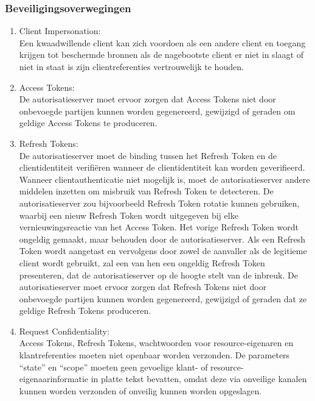 \subsubsection{Beveiligingsoverwegingen}
\label{subsubsec:beveiligingsoverwegingen}
\begin{enumerate}[label=\textbf{-}]
    \item Client Impersonation: \\
    Een kwaadwillende client kan zich voordoen als een andere client en toegang krijgen tot beschermde bronnen als de nagebootste client er niet in slaagt of niet in staat is zijn clientreferenties vertrouwelijk te houden.

    \item Access Tokens: \\
    De autorisatieserver moet ervoor zorgen dat Access Tokens niet door onbevoegde partijen kunnen worden gegenereerd, gewijzigd of geraden om geldige Access Tokens te produceren.

    \item Refresh Tokens: \\
    De autorisatieserver moet de binding tussen het Refresh Token en de clientidentiteit verifiëren wanneer de clientidentiteit kan worden geverifieerd. Wanneer clientauthenticatie niet mogelijk is, moet de autorisatieserver andere middelen inzetten om misbruik van Refresh Token te detecteren. De autorisatieserver zou bijvoorbeeld Refresh Token rotatie kunnen gebruiken, waarbij een nieuw Refresh Token wordt uitgegeven bij elke vernieuwingsreactie van het Access Token. Het vorige Refresh Token wordt ongeldig gemaakt, maar behouden door de autorisatieserver. Als een Refresh Token wordt aangetast en vervolgens door zowel de aanvaller als de legitieme client wordt gebruikt, zal een van hen een ongeldig Refresh Token presenteren, dat de autorisatieserver op de hoogte stelt van de inbreuk. De autorisatieserver moet ervoor zorgen dat Refresh Tokens niet door onbevoegde partijen kunnen worden gegenereerd, gewijzigd of geraden dat ze geldige Refresh Tokens produceren.

    \item Request Confidentiality: \\
    Access Tokens, Refresh Tokens, wachtwoorden voor resource-eigenaren en klantreferenties moeten niet openbaar worden verzonden. De parameters ``state'' en ``scope'' moeten geen gevoelige klant- of resource-eigenaarinformatie in platte tekst bevatten, omdat deze via onveilige kanalen kunnen worden verzonden of onveilig kunnen worden opgeslagen.
\end{enumerate}


